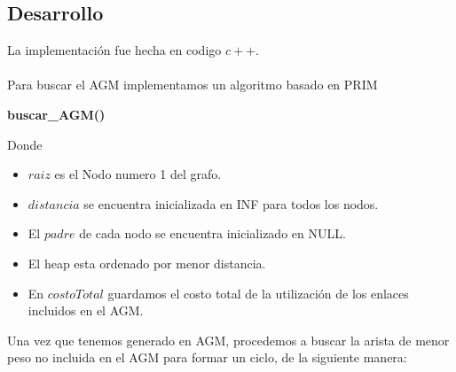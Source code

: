 \subsection{Desarrollo}

La implementaci\'on fue hecha en codigo $c++$.
\\
\\
Para buscar el AGM implementamos un algoritmo basado en PRIM

\LinesNumbered
\begin{algorithm}[H]
\DontPrintSemicolon
{}
\caption{\textbf{buscar\_AGM()} \label{buscar\_AGM }}
\end{algorithm}

Donde
\begin{itemize}
\item $raiz$ es el Nodo numero 1 del grafo.
\item $distancia$ se encuentra inicializada en INF para todos los nodos.
\item El $padre$ de cada nodo se encuentra inicializado en NULL.
\item El heap esta ordenado por menor distancia.
\item En $costoTotal$ guardamos el costo total de la utilizaci\'on de los enlaces incluidos en el AGM.
\end{itemize}

Una vez que tenemos generado en AGM, procedemos a buscar la arista de menor peso no incluida en el AGM para formar un ciclo, de la siguiente manera:

